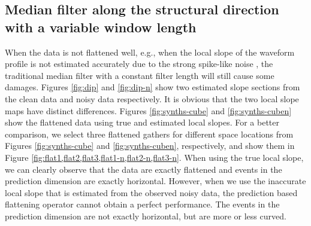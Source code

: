 \subsection{Median filter along the structural direction with a variable window length}
When the data is not flattened well, e.g., when the local slope of the waveform profile is not estimated accurately due to the strong spike-like noise , the traditional median filter with a constant filter length will still cause some damages. Figures \ref{fig:dip} and \ref{fig:dip-n} show two estimated slope sections from the clean data and noisy data respectively. It is obvious that the two local slope maps have distinct differences.  Figures \ref{fig:synths-cube} and \ref{fig:synths-cuben} show the flattened data using true and estimated local slopes. For a better comparison, we select three flattened gathers for different space locations from Figures \ref{fig:synths-cube} and \ref{fig:synths-cuben}, respectively, and show them in Figure \ref{fig:flat1,flat2,flat3,flat1-n,flat2-n,flat3-n}. When using the true local slope, we can clearly observe that the data are exactly flattened and events in the prediction dimension are exactly horizontal. However, when we use the inaccurate local slope that is estimated from the observed noisy data, the prediction based flattening operator cannot obtain a perfect performance. The events in the prediction dimension are not exactly horizontal, but are more or less curved. 


